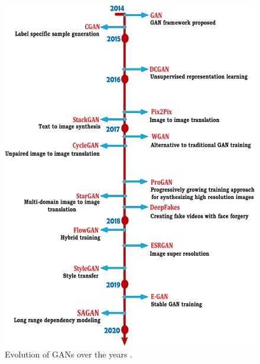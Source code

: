 \begin{figure}
        \begin{center}
 	    \includegraphics[scale=0.25]{images/relatedWorks/GANEvolution.jpg}
	    \caption[Evolution of \acp{GAN} Over the Years.]{Evolution of \acp{GAN} over the years \cite{PavanKumar.2021}.}
	    \label{fig:GANEvolution}
	    \end{center}
\end{figure}

